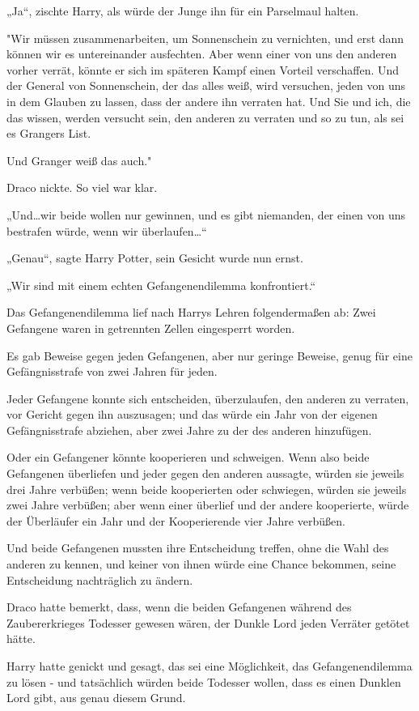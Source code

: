 {„Ja“, zischte Harry, als würde der Junge ihn für ein Parselmaul halten.

"Wir müssen zusammenarbeiten, um Sonnenschein zu vernichten, und erst dann können wir es untereinander ausfechten. Aber wenn einer von uns den anderen vorher verrät, könnte er sich im späteren Kampf einen Vorteil verschaffen. Und der General von Sonnenschein, der das alles weiß, wird versuchen, jeden von uns in dem Glauben zu lassen, dass der andere ihn verraten hat. Und Sie und ich, die das wissen, werden versucht sein, den anderen zu verraten und so zu tun, als sei es Grangers List.

Und Granger weiß das auch."

Draco nickte. So viel war klar.

„Und…wir beide wollen nur gewinnen, und es gibt niemanden, der einen von uns bestrafen würde, wenn wir überlaufen…“

„Genau“, sagte Harry Potter, sein Gesicht wurde nun ernst.

„Wir sind mit einem echten Gefangenendilemma konfrontiert.“

Das Gefangenendilemma lief nach Harrys Lehren folgendermaßen ab: Zwei Gefangene waren in getrennten Zellen eingesperrt worden.

Es gab Beweise gegen jeden Gefangenen, aber nur geringe Beweise, genug für eine Gefängnisstrafe von zwei Jahren für jeden.

Jeder Gefangene konnte sich entscheiden, überzulaufen, den anderen zu verraten, vor Gericht gegen ihn auszusagen; und das würde ein Jahr von der eigenen Gefängnisstrafe abziehen, aber zwei Jahre zu der des anderen hinzufügen.

Oder ein Gefangener könnte kooperieren und schweigen. Wenn also beide Gefangenen überliefen und jeder gegen den anderen aussagte, würden sie jeweils drei Jahre verbüßen; wenn beide kooperierten oder schwiegen, würden sie jeweils zwei Jahre verbüßen; aber wenn einer überlief und der andere kooperierte, würde der Überläufer ein Jahr und der Kooperierende vier Jahre verbüßen.

Und beide Gefangenen mussten ihre Entscheidung treffen, ohne die Wahl des anderen zu kennen, und keiner von ihnen würde eine Chance bekommen, seine Entscheidung nachträglich zu ändern.

Draco hatte bemerkt, dass, wenn die beiden Gefangenen während des Zaubererkrieges Todesser gewesen wären, der Dunkle Lord jeden Verräter getötet hätte.

Harry hatte genickt und gesagt, das sei eine Möglichkeit, das Gefangenendilemma zu lösen - und tatsächlich würden beide Todesser wollen, dass es einen Dunklen Lord gibt, aus genau diesem Grund.

}
